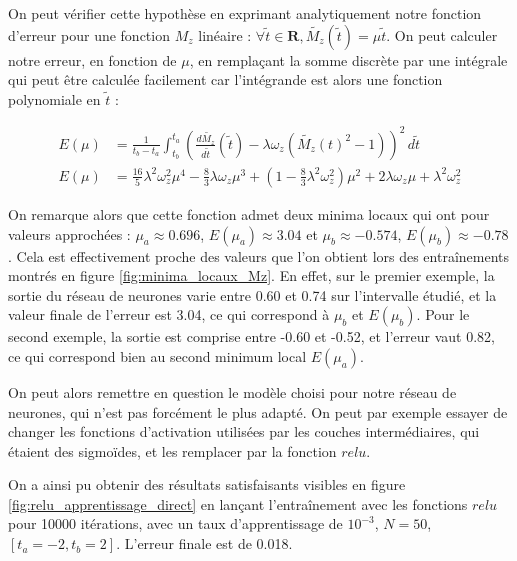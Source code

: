 \documentclass[12pt]{report}
\begin{document}
On peut vérifier cette hypothèse en exprimant analytiquement notre fonction d'erreur pour une fonction $M_z$ linéaire : $\forall \tilde{t} \in \mathbf{R}, \tilde{M_z}(\tilde{t}) = \mu  \tilde{t}$.
On peut calculer notre erreur, en fonction de $\mu$, en remplaçant la somme discrète par une intégrale qui peut être calculée facilement car
l'intégrande est alors une fonction polynomiale en $\tilde{t}$ :

\begin{equation}
    \begin{aligned}
        E(\mu) & = \frac{1}{t_b-t_a}\int_{t_b}^{t_a} (\frac{d\tilde{M_z}}{d\tilde{t}}(\tilde{t})-\lambda \omega_z (\tilde{M_z}(t)^2-1))^2 \,d \tilde{t} \\
        E(\mu) & = \frac{16}{5}\lambda^2\omega_z^2\mu^4
        - \frac{8}{3}\lambda\omega_z\mu^3
        + (1- \frac{8}{3}\lambda^2\omega_z^2)\mu^2
        + 2\lambda\omega_z\mu
        + \lambda^2\omega_z^2
    \end{aligned}
    \label{eq:fonction_erreur_analytique_M_z_lineaire}
\end{equation}

On remarque alors que cette fonction admet deux minima locaux qui ont pour valeurs approchées : $ \mu_a \approx 0.696$, $E(\mu_a) \approx 3.04$ et $\mu_b \approx -0.574$, $E(\mu_b) \approx -0.78$.
Cela est effectivement proche des valeurs que l'on obtient lors des entraînements montrés en figure \ref{fig:minima_locaux_Mz}.
En effet, sur le premier exemple, la sortie du réseau de neurones varie entre 0.60 et 0.74 sur l'intervalle étudié, et la valeur finale de l'erreur est 3.04, ce qui correspond à $\mu_b$ et $E(\mu_b)$.
Pour le second exemple, la sortie est comprise entre -0.60 et -0.52, et l'erreur vaut 0.82, ce qui correspond bien au second minimum local $E(\mu_a)$.

On peut alors remettre en question le modèle choisi pour notre réseau de neurones, qui n'est pas forcément le plus adapté.
On peut par exemple essayer de changer les fonctions d'activation utilisées par les couches intermédiaires, qui étaient des sigmoïdes, et les remplacer par la fonction $relu$.

On a ainsi pu obtenir des résultats satisfaisants visibles en figure \ref{fig:relu_apprentissage_direct} en lançant l'entraînement avec les fonctions $relu$ pour 10000 itérations, avec un taux d'apprentissage de $10^{-3}$, $N=50$, $[t_a = -2, t_b = 2]$.
L'erreur finale est de 0.018.
\end{document}

